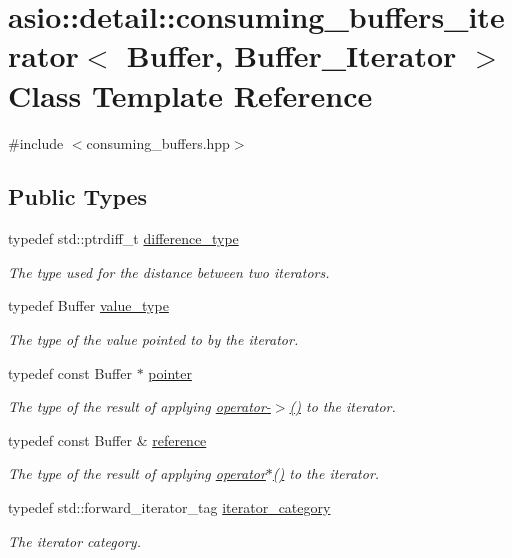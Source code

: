\hypertarget{classasio_1_1detail_1_1consuming__buffers__iterator}{}\section{asio\+:\+:detail\+:\+:consuming\+\_\+buffers\+\_\+iterator$<$ Buffer, Buffer\+\_\+\+Iterator $>$ Class Template Reference}
\label{classasio_1_1detail_1_1consuming__buffers__iterator}


{\ttfamily \#include $<$consuming\+\_\+buffers.\+hpp$>$}

\subsection*{Public Types}
\begin{DoxyCompactItemize}
\item 
typedef std\+::ptrdiff\+\_\+t \hyperlink{classasio_1_1detail_1_1consuming__buffers__iterator_ae0f3c33c5ca70ab6fb129299f6092b78}{difference\+\_\+type}
\begin{DoxyCompactList}\small\item\em The type used for the distance between two iterators. \end{DoxyCompactList}\item 
typedef Buffer \hyperlink{classasio_1_1detail_1_1consuming__buffers__iterator_a2462f38aaa732fe3694cae9d8896ee7e}{value\+\_\+type}
\begin{DoxyCompactList}\small\item\em The type of the value pointed to by the iterator. \end{DoxyCompactList}\item 
typedef const Buffer $\ast$ \hyperlink{classasio_1_1detail_1_1consuming__buffers__iterator_ae79f642abeaf9c9cd33a326a1cf00293}{pointer}
\begin{DoxyCompactList}\small\item\em The type of the result of applying \hyperlink{classasio_1_1detail_1_1consuming__buffers__iterator_a2eaf29938b709e047a7d77ce79113a59}{operator-\/$>$()} to the iterator. \end{DoxyCompactList}\item 
typedef const Buffer \& \hyperlink{classasio_1_1detail_1_1consuming__buffers__iterator_afb896cbf35f476cb828083b5439d0991}{reference}
\begin{DoxyCompactList}\small\item\em The type of the result of applying \hyperlink{classasio_1_1detail_1_1consuming__buffers__iterator_a2ab29aa14557ac04a71b1f5015a06c0d}{operator$\ast$()} to the iterator. \end{DoxyCompactList}\item 
typedef std\+::forward\+\_\+iterator\+\_\+tag \hyperlink{classasio_1_1detail_1_1consuming__buffers__iterator_a23bcf111a9ac4efe9ce2daebd4bd11c9}{iterator\+\_\+category}
\begin{DoxyCompactList}\small\item\em The iterator category. \end{DoxyCompactList}\end{DoxyCompactItemize}
